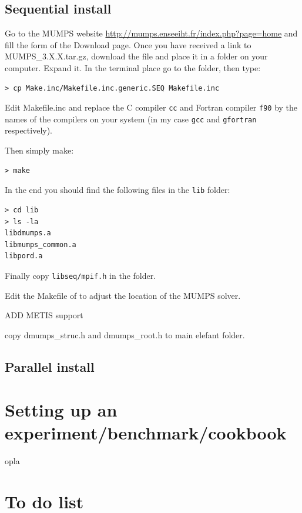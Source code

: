 \subsection{Sequential install}

Go to the MUMPS website \url{http://mumps.enseeiht.fr/index.php?page=home} and 
fill the form of the Download page. 
Once you have received a link to {\filenamefont MUMPS\_3.X.X.tar.gz}, download
the file and place it in a folder on your computer. Expand it. 
In the terminal place go to the folder, then type:
\begin{verbatim}
> cp Make.inc/Makefile.inc.generic.SEQ Makefile.inc
\end{verbatim}
Edit {\filenamefont Makefile.inc} and replace the C compiler {\tt cc} 
and Fortran compiler {\tt f90} by the names of the compilers on 
your system (in my case {\tt gcc} and {\tt gfortran} respectively).

Then simply make:
\begin{verbatim}
> make 
\end{verbatim}
In the end you should find the following files in the {\tt lib} folder:
\begin{verbatim}
> cd lib
> ls -la
libdmumps.a
libmumps_common.a
libpord.a
\end{verbatim}
Finally copy {\tt libseq/mpif.h} in the \elefant folder.

Edit the Makefile of \elefant to adjust the location of the MUMPS solver.

ADD METIS support


copy dmumps\_struc.h and dmumps\_root.h to main elefant folder.


\subsection{Parallel install}



\section{Setting up an experiment/benchmark/cookbook}

opla

\begin{center}

\end{center}

\section{To do list}




